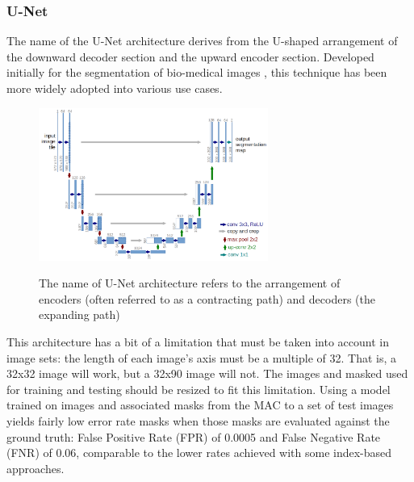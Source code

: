 \documentclass[agriculture,article,submit,pdftex,moreauthors]{Definitions/mdpi}
\begin{document}
\subsubsection{U-Net}
The name of the U-Net architecture derives from the U-shaped arrangement of the downward decoder section and the upward encoder section. Developed initially for the segmentation of bio-medical images \cite{Ronneberger2015-ye}, this technique has been more widely adopted into various use cases.

\begin{figure}[H]
	\centering
	\includegraphics[height=5cm]{figures/u-net-architecture.png}
	\label{fig:u-net}
	\caption[U-Net architecture]{The name of U-Net architecture refers to the arrangement of encoders (often referred to as a contracting path) and decoders (the expanding path)}
\end{figure}
This architecture has a bit of a limitation that must be taken into account in image sets: the length of each image's axis must be a multiple of 32. That is, a 32x32 image will work, but a 32x90 image will not. The images and masked used for training and testing should be resized to fit this limitation. Using a model trained on images and associated masks from the MAC to a set of test images yields fairly low error rate masks when  those masks are evaluated against the ground truth: False Positive Rate (FPR) of 0.0005 and False Negative Rate (FNR) of 0.06, comparable to the lower rates achieved with some index-based approaches.
\end{document}

